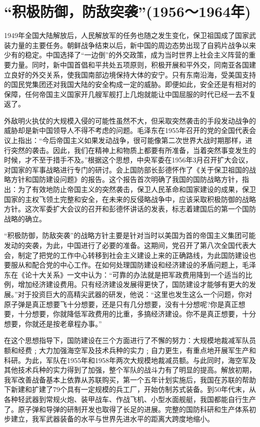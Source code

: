 \documentclass[UTF8, 12pt, a4paper]{ctexrep}
\begin{document}
\section{“积极防御，防敌突袭”(1956～1964年)}

1949年全国大陆解放后，人民解放军的任务也随之发生变化，保卫祖国成了国家武装力量的主要任务。朝鲜战争结束以后，新中国的周边态势出现了自鸦片战争以来少有的稳定。中国选择了“一边倒”的外交政策，成为当时世界上社会主义阵营的重要力量。同时，新中国首倡和平共处五项原则，积极开展和平外交，同南亚各国建立良好的外交关系，使我国南部边境保持大体的安宁。只有东南沿海，受美国支持的国民党集团还对我国大陆的安全构成一定的威胁。即便如此，安全还是有相对的保障，任何帝国主义国家开几艘军舰打上几炮就能让中国屈服的时代已经一去不复返了。

外敌明火执仗的大规模入侵的可能性虽然不大，但采取突然袭击的手段发动战争的威胁却是新中国领导人不得不考虑的问题。毛泽东在1955年召开的党的全国代表会议上指出：“今后帝国主义如果发动战争，很可能像第二次世界大战时期那样，进行突然的袭击。因此，我们在精神上和物质上都要有所准备，当着突然事变发生的时候，才不至于措手不及。”根据这个思想，中央军委在1956年3月召开扩大会议，对国家的军事战略进行专门的研讨。会上国防部长彭德怀作了《关于保卫祖国的战略方针和国防建设问题》的报告。这个报告首次明确了我国的国防战略方针，指出：为了有效地防止帝国主义的突然袭击，保卫人民革命和国家建设的成果，保卫国家的主权飞领土完整和安全，在未来的反侵略战争中，应该采取积极防御的战略方针。这次军委扩大会议的召开和彭德怀讲话的发表，标志着建国后的第一个国防战略的确立。

“积极防御，防敌突袭”的战略方针主要是针对当时以美国为首的帝国主义集团可能发动的突袭，为此，中国进行了必要的准备。这期间，党召开了第八次全国代表大会，制定了把党的工作中心转移到社会主义建设上来的正确路线，为此国防建设也要服从和配合党的中心工作。在如何处理国防建设和经济建设的矛盾问题上，毛泽东在《论十大关系》一文中认为：“可靠的办法就是把军政费用降到一个适当的比例，增加经济建设费用。只有经济建设发展得更快了，国防建设才能够有更大的发展。”对于投资巨大的高精尖武器的研发，他说：“这里也发生这么一个问题，你对原子弹是真正想要飞十分想要，还是只有几分想要，没有十分想呢?你是真正想要，十分想要，你就降低军政费用的比重，多搞经济建设。你不是真正想要，十分想要，你就还是按老章程办事。”

在这个思想指导下，国防建设在三个方面进行了不懈的努力：大规模地裁减军队员额和经费﹔大力加强海空军及技术兵种的实力﹔自力更生，有重点地开展军生产和科研。为此，军队在1955年和1958年两次大规模地裁减员额。与此同时，海空军及其他技术兵种的实力得到了加强，整个军队的战斗力有了明显的提高。解放初期，我军改善战备基本上依靠从苏联购买，第一个五年计划实施后，我国在苏联的帮助下新建和扩建了79个具有一定规模的兵工厂，开始仿制苏式装备。到50年代末，从各种轻武器到常规火炮、装甲战车、作战飞机、小型水面舰艇，我国都能自行生产了。原子弹和导弹的研制开发也取得了长足的进展。完整的国防科研和生产体系初步建立，我军武器装备的水平与世界先进水平的距离大跨度地缩小。
\end{document}
